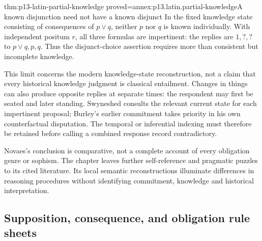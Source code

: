 \begin{hblemma}{thm:p13-latin-partial-knowledge}
 {proved=annex:p13.latin.partial-knowledge}{A known disjunction need not have a known disjunct}
In the fixed knowledge state consisting of consequences of \(p\lor q\),
neither \(p\) nor \(q\) is known individually. With independent positum
\(r\), all three formulas are impertinent: the replies are \(1,?,?\)
to \(p\lor q,p,q\). Thus the disjunct-choice assertion requires more
than consistent but incomplete knowledge.
\end{hblemma}

This limit concerns the modern knowledge-state reconstruction, not a
claim that every historical knowledge judgment is classical entailment.
Changes in things can also produce opposite replies at separate times:
the respondent may first be seated and later standing. Swyneshed consults
the relevant current state for each impertinent proposal; Burley's earlier
commitment takes priority in his own counterfactual disputation.
The temporal or inferential indexing must therefore be retained before
calling a combined response record contradictory.

Novaes's conclusion is comparative, not a complete account of every
obligation genre or sophism. The chapter leaves further self-reference
and pragmatic puzzles to its cited literature. Its local semantic
reconstructions illuminate differences in reasoning procedures without
identifying commitment, knowledge and historical interpretation.

\subsection{Supposition, consequence, and obligation rule sheets}

